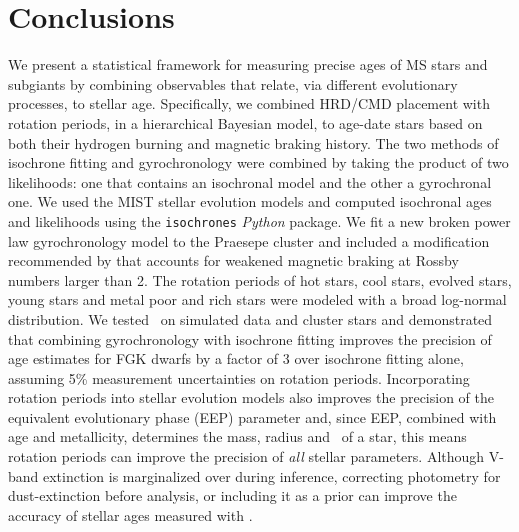 \section{Conclusions}
\label{section:conclusion}

We present a statistical framework for measuring precise ages of MS stars and
subgiants by combining observables that relate, via different evolutionary
processes, to stellar age.
Specifically, we combined HRD/CMD placement with rotation periods, in a
hierarchical Bayesian model, to age-date stars based on both their hydrogen
burning and magnetic braking history.
The two methods of isochrone fitting and gyrochronology were combined by
taking the product of two likelihoods: one that contains an isochronal model
and the other a gyrochronal one.
We used the MIST stellar evolution models and computed isochronal ages and
likelihoods using the {\tt isochrones} {\it Python} package.
We fit a new broken power law gyrochronology model to the Praesepe cluster
and included a modification recommended by \citet{vansaders2016} that accounts
for weakened magnetic braking at Rossby numbers larger than 2.
The rotation periods of hot stars, cool stars, evolved stars, young stars and
metal poor and rich stars were modeled with a broad log-normal distribution.
We tested \sd\ on simulated data and cluster stars and demonstrated that
combining gyrochronology with isochrone fitting improves the precision of age
estimates for FGK dwarfs by a factor of 3 over isochrone fitting alone,
assuming 5\% measurement uncertainties on rotation periods.
Incorporating rotation periods into stellar evolution models also improves the
precision of the equivalent evolutionary phase (EEP) parameter and, since EEP,
combined with age and metallicity, determines the mass, radius and \logg\ of a
star, this means rotation periods can improve the precision of {\it all}
stellar parameters.
Although V-band extinction is marginalized over during inference, correcting
photometry for dust-extinction before analysis, or including it as a
prior can improve the accuracy of stellar ages measured with \sd.

